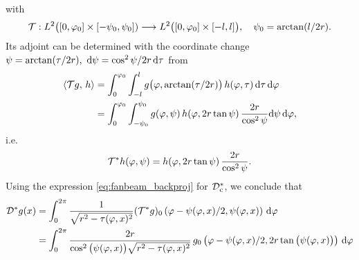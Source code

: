 \documentclass{amsart}
\renewcommand*{\phi}{\varphi}
\begin{document}
\begin{example}
 with
 \begin{equation*}
  \OPT: L^2\big([0, \phi_0] \times [-\psi_0, \psi_0]) \Lto L^2\big([0, \phi_0] \times [-l, l]\big), \quad \psi_0 = \arctan(l/2r).
 \end{equation*}
 Its adjoint can be determined with the coordinate change $\psi = \arctan(\tau/2r),\ \mathrm{d}\psi = \cos^2\psi / 2r\, \mathrm{d}\tau$ from
 \begin{align*}
  \INNER{\OPT g}{h} 
  &= \int_0^{\phi_0} \int_{-l}^l g\big(\phi, \arctan(\tau/2r)\big)\, h(\phi, \tau)\, \D\tau\, \D\phi \\
  &= \int_0^{\phi_0} \int_{-\psi_0}^{\psi_0} g(\phi, \psi)\, h(\phi, 2r\tan\psi)\, \frac{2r}{\cos^2\psi} \D\psi\, \D\phi,
 \end{align*}
 i.e.
 \begin{equation}
  \label{eq:fanflat_curved2flat_adj}
  \DUALOPT h(\phi, \psi) = h(\phi, 2r\tan\psi)\, \frac{2r}{\cos^2\psi}.
 \end{equation} 
 Using the expression \eqref{eq:fanbeam_backproj} for ${\mathcal{D}}_{\mathrm{c}}^*$, we conclude that
 \begin{align}
  \DUALOPD g(x) 
  &= \int_0^{2\pi} \frac{1}{\sqrt{r^2-\tau(\phi, x)^2}} (\DUALOPT g)_0\left(\phi - \psi(\phi,x)/2, \psi(\phi,x) \right)\, \D\phi 
  \notag \\
  \label{eq:fanflat_backproj}
  &= \int_0^{2\pi} \frac{2r}{\cos^2\big(\psi(\phi,x)\big)\sqrt{r^2-\tau(\phi, x)^2}}\,
  g_0\left(\phi - \psi(\phi,x)/2, 2r \tan\big(\psi(\phi,x)\big) \right)\, \D\phi 
 \end{align} 
\end{example}
\end{document}
